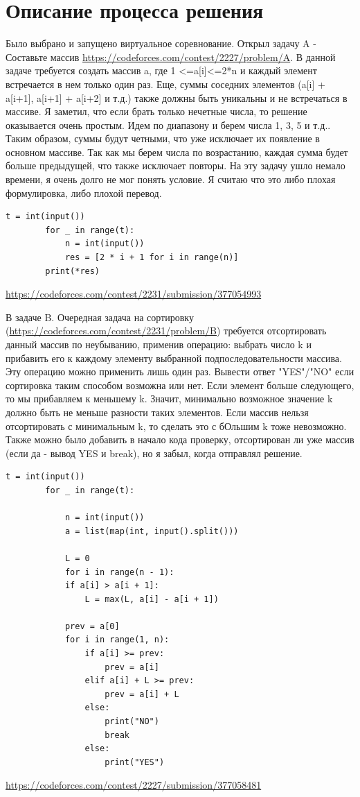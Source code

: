 \documentclass[oneside,a4paper,14pt]{extarticle} %
\begin{document}
	\section*{Описание процесса решения}
	Было выбрано и запущено виртуальное соревнование.
	Открыл задачу A - Составьте массив \url{https://codeforces.com/contest/2227/problem/A}.
	В данной задаче требуется создать массив a, где 1 <=a[i]<=2*n и каждый элемент
	встречается в нем только один раз. Еще, суммы соседних элементов (a[i] + a[i+1],
	a[i+1] + a[i+2] и т.д.) также должны быть уникальны и не встречаться в массиве.
	Я заметил, что если брать только нечетные числа, то решение оказывается очень простым.
	Идем по диапазону и берем числа 1, 3, 5 и т.д.. Таким образом, суммы будут четными, 
	что уже исключает их появление в основном массиве. Так как мы берем числа по 
	возрастанию, каждая сумма будет больше предыдущей, что также исключает повторы.
	На эту задачу ушло немало времени, я очень долго не мог понять условие. Я считаю что это либо
	плохая формулировка, либо плохой перевод.
	
	
	\begin{lstlisting}[caption={Решение задачи A - Составьте массив}]
		t = int(input())
		for _ in range(t):
			n = int(input())
			res = [2 * i + 1 for i in range(n)]
		print(*res)
	\end{lstlisting}
	\url{https://codeforces.com/contest/2231/submission/377054993}
	\newpage
	
	В задаче B. Очередная задача на сортировку (\url{https://codeforces.com/contest/2231/problem/B}) требуется 
	отсортировать данный массив по неубыванию, применив операцию: выбрать число k и прибавить его к каждому 
	элементу выбранной подпоследовательности массива. Эту операцию можно применить лишь один раз. Вывести
	ответ "YES"/"NO" если сортировка таким способом возможна или нет. Если элемент больше следующего, то мы
	прибавляем к меньшему k. Значит, минимально возможное значение k должно быть не меньше разности таких элементов.
	Если массив нельзя отсортировать с минимальным k, то сделать это с бОльшим k тоже невозможно. Также можно было 
	добавить в начало кода проверку, отсортирован ли уже массив (если да - вывод YES и break), но я забыл, когда
	отправлял решение.
	
	\begin{lstlisting}[caption={Решение задачи B. Очередная задача на сортировку}]
		t = int(input())
		for _ in range(t):
		
			n = int(input())
			a = list(map(int, input().split()))
			
			L = 0
			for i in range(n - 1):
			if a[i] > a[i + 1]:
				L = max(L, a[i] - a[i + 1])
			
			prev = a[0]
			for i in range(1, n):
				if a[i] >= prev:
					prev = a[i]
				elif a[i] + L >= prev:
					prev = a[i] + L
				else:
					print("NO")
					break
				else:
					print("YES")
	\end{lstlisting}
	\url{https://codeforces.com/contest/2227/submission/377058481} \\
	
\end{document}

